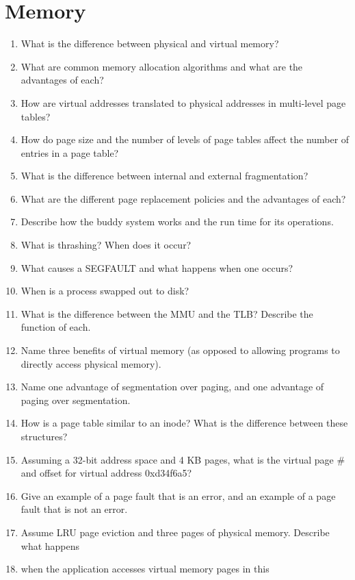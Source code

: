 \documentclass[11pt]{article}
\begin{document}
\section{Memory}
\label{sec-9}

\begin{enumerate}
\item What is the difference between physical and virtual memory?
\item What are common memory allocation algorithms and what are the advantages of each?
\item How are virtual addresses translated to physical addresses in multi-level page tables?
\item How do page size and the number of levels of page tables affect
      the number of entries in a page table?
\item What is the difference between internal and external fragmentation?
\item What are the different page replacement policies and the
      advantages of each?
\item Describe how the buddy system works and the run time for its operations.
\item What is thrashing? When does it occur?
\item What causes a SEGFAULT and what happens when one occurs?
\item When is a process swapped out to disk?
\item What is the difference between the MMU and the TLB? Describe
       the function of each.
\item Name three benefits of virtual memory (as opposed to allowing
       programs to directly access physical memory).
\item Name one advantage of segmentation over paging, and one
       advantage of paging over segmentation.
\item How is a page table similar to an inode? What is the difference
       between these structures?
\item Assuming a 32-bit address space and 4 KB pages, what is the
       virtual page \# and offset for virtual address 0xd34f6a5?
\item Give an example of a page fault that is an error, and an
       example of a page fault that is not an error.
\item Assume LRU page eviction and three pages of physical
       memory. Describe what happens
\item when the application accesses virtual memory pages in this

\end{enumerate}
\end{document}
